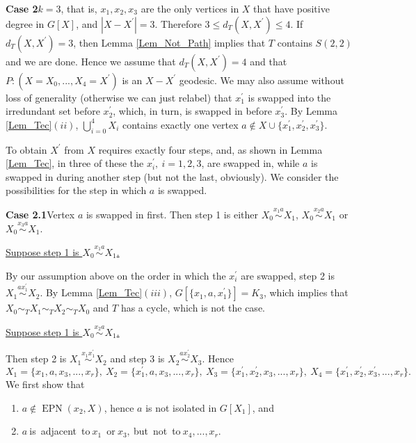 \documentclass[12pt]{article}%
\begin{document}
\noindent\textbf{Case 2\hspace{0.1in}}$k=3$, that is, $x_{1},x_{2},x_{3}$ are
the only vertices in $X$ that have positive degree in $G[X]$, and
$|X-X^{\prime}|=3$. Therefore $3\leq d_{T}(X,X^{\prime})\leq4$. If
$d_{T}(X,X^{\prime})=3$, then Lemma \ref{Lem_Not_Path} implies that $T$
contains $S(2,2)$ and we are done. Hence we assume that $d_{T}(X,X^{\prime
})=4$ and that $P:(X=X_{0},...,X_{4}=X^{\prime})$ is an $X-X^{\prime}$
geodesic. We may also assume without loss of generality (otherwise we can just
relabel) that $x_{1}^{\prime}$ is swapped into the irredundant set before
$x_{2}^{\prime}$, which, in turn, is swapped in before $x_{3}^{\prime}$. By
Lemma \ref{Lem_Tec}$(ii)$, $\bigcup_{i=0}^{4}X_{i}$ contains exactly one
vertex $a\notin X\cup\{x_{1}^{\prime},x_{2}^{\prime},x_{3}^{\prime}\}$.

To obtain $X^{\prime}$ from $X$ requires exactly four steps, and, as shown in
Lemma \ref{Lem_Tec}, in three of these the $x_{i}^{\prime},\ i=1,2,3$, are
swapped in, while $a$ is swapped in during another step (but not the last,
obviously). We consider the possibilities for the step in which $a$ is
swapped.\medskip

\noindent\textbf{Case 2.1\hspace{0.1in}}Vertex $a$ is swapped in first. Then
step 1 is either $X_{0}\overset{x_{1}a}{\sim}X_{1}$, $X_{0}\overset{x_{2}%
a}{\sim}X_{1}$ or $X_{0}\overset{x_{3}a}{\sim}X_{1}$.

\noindent\underline{Suppose step 1 is $X_{0}\overset{x_{1}a}{\sim}X_{1}$.}

By our assumption above on the order in which the $x_{i}^{\prime}$ are
swapped, step 2 is $X_{1}\overset{ax_{1}^{\prime}}{\sim}X_{2}$. By Lemma
\ref{Lem_Tec}$(iii)$, $G[\{x_{1},a,x_{1}^{\prime}\}]=K_{3}$, which implies
that $X_{0}\sim_{T}X_{1}\sim_{T}X_{2}\sim_{T}X_{0}$ and $T$ has a cycle, which
is not the case.

\noindent\underline{Suppose step 1 is $X_{0}\overset{x_{2}a}{\sim}X_{1}$.}

Then step 2 is $X_{1}\overset{x_{1}x_{1}^{\prime}}{\sim}X_{2}$ and step 3 is
$X_{2}\overset{ax_{2}^{\prime}}{\sim}X_{3}$. Hence
\[
X_{1}=\{x_{1},a,x_{3},...,x_{r}\},\ X_{2}=\{x_{1}^{\prime},a,x_{3}%
,...,x_{r}\},\ X_{3}=\{x_{1}^{\prime},x_{2}^{\prime},x_{3},...,x_{r}%
\},\ X_{4}=\{x_{1}^{\prime},x_{2}^{\prime},x_{3}^{\prime},...,x_{r}\}.
\]
We first show that

\begin{enumerate}
\item[(a)] $a\notin\operatorname{EPN}(x_{2},X)$, hence $a$ is not isolated in
$G[X_{1}]$, and

\item[(b)] $a\ $is\ adjacent\ to$\ x_{1}$\ or$\ x_{3},\ $but\ not\ to$\ x_{4}%
,...,x_{r}.$
\end{enumerate}
\end{document}
